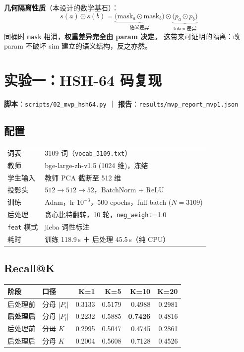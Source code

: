 \documentclass[11pt,a4paper]{ctexart}
\newcommand{\keybox}[1]{%
  \begin{center}\begin{minipage}{0.95\textwidth}%
  \colorbox{graylight}{\begin{minipage}{0.93\textwidth}\vspace{3pt}#1\vspace{3pt}\end{minipage}}%
  \end{minipage}\end{center}}
\begin{document}
\keybox{%
\textbf{几何隔离性质}（本设计的数学基石）：
$$s(a)\odot s(b)=\underbrace{\bigl(\text{mask}_a\odot\text{mask}_b\bigr)}_{\text{语义差异}}
\odot\underbrace{\bigl(p_a\odot p_b\bigr)}_{\text{token 差异}}$$
同桶时 \texttt{mask} 相消，\textbf{权重差异完全由 param 决定}。
这带来可证明的隔离：改 param 不破坏 sim 建立的语义结构，反之亦然。}

\section{实验一：HSH-64 码复现}

\textbf{脚本}：\texttt{scripts/02\_mvp\_hsh64.py} ｜
\textbf{报告}：\texttt{results/mvp\_report\_mvp1.json}

\subsection{配置}

\begin{center}
\begin{tabularx}{\textwidth}{@{}lX@{}}
\toprule
词表 & 3109 词（\texttt{vocab\_3109.txt}） \\
教师 & bge-large-zh-v1.5 (1024 维)，冻结 \\
学生输入 & 教师 PCA 截断至 512 维 \\
投影头 & $512\to512\to52$，BatchNorm + ReLU \\
训练 & Adam，lr $10^{-3}$，500 epochs，full-batch ($N{=}3109$) \\
后处理 & 贪心比特翻转，10 轮，\texttt{neg\_weight}=1.0 \\
\texttt{feat} 模式 & jieba 词性标注 \\
耗时 & 训练 118.9\,s ＋ 后处理 45.5\,s（纯 CPU） \\
\bottomrule
\end{tabularx}
\end{center}

\subsection{Recall@K}

\begin{center}
\begin{tabularx}{\textwidth}{@{}llrrrr@{}}
\toprule
\textbf{阶段} & \textbf{口径} & K=1 & K=5 & K=10 & K=20 \\
\midrule
后处理前 & 分母 $|P_i|$ & 0.3133 & 0.5179 & 0.4988 & 0.2981 \\
\textbf{后处理后} & 分母 $|P_i|$ & 0.2232 & 0.5885 & \textbf{0.7426} & 0.4816 \\
后处理前 & 分母 $K$ & 0.2995 & 0.5047 & 0.4745 & 0.2861 \\
后处理后 & 分母 $K$ & 0.2004 & 0.5608 & 0.7128 & 0.4526 \\
\bottomrule
\end{tabularx}
\end{center}
\end{document}
